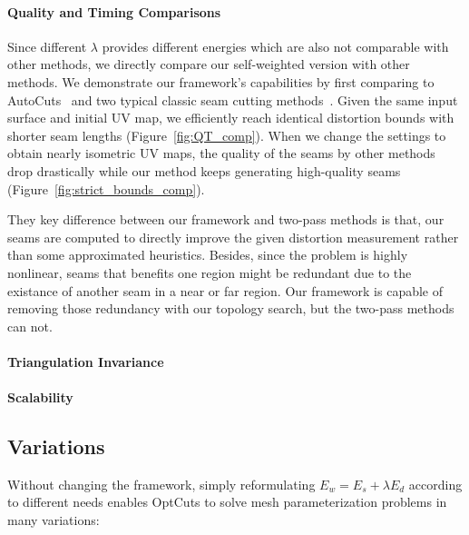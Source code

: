 \paragraph{Quality and Timing Comparisons}  Since different $\lambda$ provides different energies which are also not comparable with other methods, we directly compare our self-weighted version with other methods. We demonstrate our framework's capabilities by first comparing to AutoCuts~\cite{Poranne2017Autocuts} and two typical classic seam cutting methods~\cite{Gu2002Geometry,Sheffer2002Seamster}. Given the same input surface and initial UV map, we efficiently reach identical distortion bounds with shorter seam lengths (Figure~\ref{fig:QT_comp}). 
When we change the settings to obtain nearly isometric UV maps, the quality of the seams by other methods drop drastically while our method keeps generating high-quality seams (Figure~\ref{fig:strict_bounds_comp}).

They key difference between our framework and two-pass methods is that, our seams are computed to directly improve the given distortion measurement rather than some approximated heuristics. Besides, since the problem is highly nonlinear, seams that benefits one region might be redundant due to the existance of another seam in a near or far region. Our framework is capable of removing those redundancy with our topology search, but the two-pass methods can not.

\paragraph{Triangulation Invariance} 

\paragraph{Scalability} \minchen{[TODO]}

\subsection{Variations}
\label{sec:results_variations}

Without changing the framework, simply reformulating $E_w = E_s + \lambda E_d$ according to different needs enables OptCuts to solve mesh parameterization problems in many variations:

